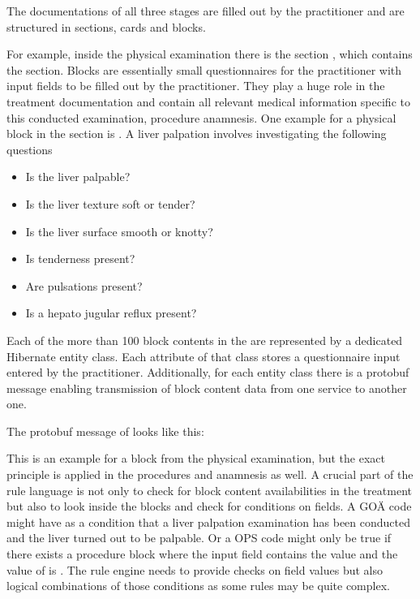 The documentations of all three stages are filled out by the practitioner and are structured in sections, cards and blocks.

For example, inside the physical examination there is the section , which contains the  section.
Blocks are essentially small questionnaires for the practitioner with input fields to be filled out by the practitioner.
They play a huge role in the treatment documentation and contain all relevant medical information specific to this conducted examination, procedure anamnesis.
One example for a physical block in the  section is .
A liver palpation involves investigating the following questions

\begin{itemize}
    \item Is the liver palpable?
    \item Is the liver texture soft or tender?
    \item Is the liver surface smooth or knotty?
    \item Is tenderness present?
    \item Are pulsations present?
    \item Is a hepato jugular reflux present?
\end{itemize}

Each of the more than 100 block contents in the \AVS are represented by a dedicated Hibernate entity class.
Each attribute of that class stores a questionnaire input entered by the practitioner.
Additionally, for each entity class there is a protobuf message enabling transmission of block content data from one service to another one.

The protobuf message of  looks like this:




This is an example for a block from the physical examination, but the exact principle is applied in the procedures and anamnesis as well.
A crucial part of the rule language is not only to check for block content availabilities in the treatment but also to look inside the blocks and check for conditions on fields.
A GOÄ code might have as a condition that a liver palpation examination has been conducted and the liver turned out to be palpable.
Or a OPS code might only be true if there exists a procedure block  where the input field  contains the value  and the value of  is .
The rule engine needs to provide checks on field values but also logical combinations of those conditions as some rules may be quite complex.


